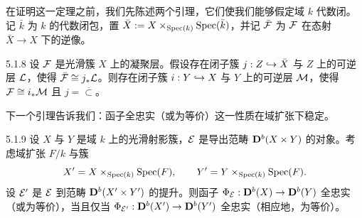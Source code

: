 在证明这一定理之前，我们先陈述两个引理，它们使我们能够假定域 $k$ 代数闭。记 $\bar k$ 为 $k$ 的代数闭包，置 $\bar X:=X\times_{\operatorname{Spec}(k)}\operatorname{Spec}(\bar k)$，并记 $\bar{\mathcal{F}}$ 为 $\mathcal{F}$ 在态射 $\bar X\to X$ 下的逆像。

\begin{lemma}[37]{5.1.8}
设 $\mathcal{F}$ 是光滑簇 $X$ 上的凝聚层。假设存在闭子簇 $j:Z\hookrightarrow\bar X$ 与 $Z$ 上的可逆层 $\mathcal{L}$，使得 $\bar{\mathcal{F}}\cong j_*\mathcal{L}$。则存在闭子簇 $i:Y\hookrightarrow X$ 与 $Y$ 上的可逆层 $\mathcal{M}$，使得 $\mathcal{F}\cong i_*\mathcal{M}$ 且 $j=\overline{\subset}$。
\end{lemma}


下一个引理告诉我们：函子全忠实（或为等价）这一性质在域扩张下稳定。


\begin{lemma}[37]{5.1.9}
设 $X$ 与 $Y$ 是域 $k$ 上的光滑射影簇，$\mathcal{E}$ 是导出范畴 $\mathbf{D}^{b}(X\times Y)$ 的对象。考虑域扩张 $F/k$ 与簇
\begin{equation*}
X'=X\times_{\operatorname{Spec}(k)}\operatorname{Spec}(F),\qquad Y'=Y\times_{\operatorname{Spec}(k)}\operatorname{Spec}(F).
\end{equation*}
设 $\mathcal{E}'$ 是 $\mathcal{E}$ 到范畴 $\mathbf{D}^{b}(X'\times Y')$ 的提升。则函子 $\Phi_{\mathcal{E}}:\mathbf{D}^{b}(X)\to\mathbf{D}^{b}(Y)$ 全忠实（或为等价），当且仅当 $\Phi_{\mathcal{E}'}:\mathbf{D}^{b}(X')\to\mathbf{D}^{b}(Y')$ 全忠实（相应地，为等价）。
\end{lemma}


